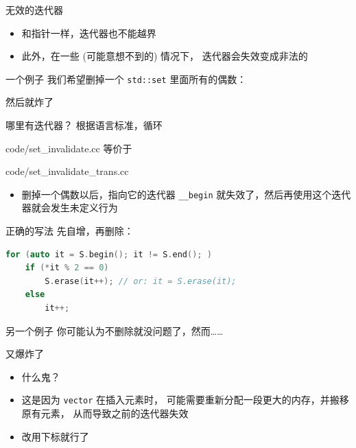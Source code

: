 \documentclass[10pt,mathserif]{beamer}
\newcommand{\lstcode}[1] {  }
\newcommand{\lstterm}[1] {  }
\begin{document}
\begin{frame}{无效的迭代器}
	\begin{itemize}
		\item 和指针一样，迭代器也不能越界
		\item 此外，在一些 (可能意想不到的) 情况下，
			迭代器会失效变成非法的
	\end{itemize}
\end{frame}

\begin{frame}{一个例子}
	我们希望删掉一个 \lstinline!std::set! 里面所有的偶数：
	\lstcode{set_invalidate.cc}
\end{frame}

\begin{frame}{然后就炸了}
	\lstterm{set_invalidate.out}
\end{frame}

\begin{frame}{哪里有迭代器？}
	根据语言标准，循环
	
	{code/set_invalidate.cc}
	等价于
	
	{code/set_invalidate_trans.cc}
	\pause
	\begin{itemize}
		\item 删掉一个偶数以后，指向它的迭代器 \lstinline!__begin!
			就失效了，然后再使用这个迭代器就会发生未定义行为
	\end{itemize}
\end{frame}

\begin{frame}[fragile]{正确的写法}
	先自增，再删除：
\begin{lstlisting}[language=C++, numbers=none]
for (auto it = S.begin(); it != S.end(); )
    if (*it % 2 == 0)
		S.erase(it++); // or: it = S.erase(it);
    else
        it++;
\end{lstlisting}
\end{frame}

\begin{frame}{另一个例子}
	你可能认为不删除就没问题了，然而……
	\lstcode{vec_invalidate.cc}
\end{frame}

\begin{frame}{又爆炸了}
	\lstterm{vec_invalidate.out}
	\begin{itemize}
		\item 什么鬼？
			\pause
		\item 这是因为 \lstinline|vector| 在插入元素时，
			可能需要重新分配一段更大的内存，并搬移原有元素，
			从而导致之前的迭代器失效
			\pause
		\item 改用下标就行了
	\end{itemize}
\end{frame}
\end{document}
